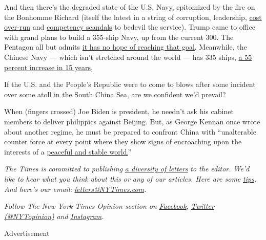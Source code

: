 And then there's the degraded state of the U.S. Navy, epitomized by the
fire on the Bonhomme Richard (itself the latest in a string of
corruption, leadership,
\href{https://news.usni.org/2020/07/02/navy-removes-ford-carrier-program-manager-citing-performance-over-time}{cost
over-run} and
\href{https://www.navytimes.com/news/your-navy/2019/01/14/worse-than-you-thought-inside-the-secret-fitzgerald-probe-the-navy-doesnt-want-you-to-read/}{competency
scandals} to bedevil the service). Trump came to office with grand plans
to build a 355-ship Navy, up from the current 300. The Pentagon all but
admits
\href{https://breakingdefense.com/2020/02/navy-marines-caught-by-surprise-by-espers-budget-cuts/}{it
has no hope of reaching that goal}. Meanwhile, the Chinese Navy ---
which isn't stretched around the world --- has 335 ships,
\href{https://www.nationaldefensemagazine.org/articles/2020/3/9/eagle-vs-dragon-how-the-us-and-chinese-navies-stack-up}{a
55 percent increase in 15 years},

If the U.S. and the People's Republic were to come to blows after some
incident over some atoll in the South China Sea, are we confident we'd
prevail?

When (fingers crossed) Joe Biden is president, he needn't ask his
cabinet members to deliver philippics against Beijing. But, as George
Kennan once wrote about another regime, he must be prepared to confront
China with ``unalterable counter force at every point where they show
signs of encroaching upon the interests of a
\href{https://www.foreignaffairs.com/articles/russian-federation/1947-07-01/sources-soviet-conduct}{peaceful
and stable world.}''

\emph{The Times is committed to publishing}
\href{https://www.nytimes3xbfgragh.onion/2019/01/31/opinion/letters/letters-to-editor-new-york-times-women.html}{\emph{a
diversity of letters}} \emph{to the editor. We'd like to hear what you
think about this or any of our articles. Here are some}
\href{https://help.nytimes3xbfgragh.onion/hc/en-us/articles/115014925288-How-to-submit-a-letter-to-the-editor}{\emph{tips}}\emph{.
And here's our email:}
\href{mailto:letters@NYTimes.com}{\emph{letters@NYTimes.com}}\emph{.}

\emph{Follow The New York Times Opinion section on}
\href{https://www.facebookcorewwwi.onion/nytopinion}{\emph{Facebook}}\emph{,}
\href{http://twitter.com/NYTOpinion}{\emph{Twitter (@NYTopinion)}}
\emph{and}
\href{https://www.instagram.com/nytopinion/}{\emph{Instagram}}\emph{.}

Advertisement

